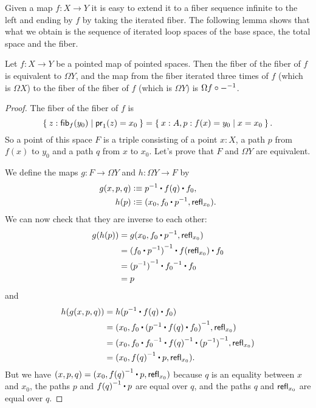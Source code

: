 Given a map $f:X\to Y$ it is easy to extend it to a fiber sequence infinite to
the left and ending by $f$ by taking the iterated fiber. The following lemma
shows that what we obtain is the sequence of iterated loop spaces of the base
space, the total space and the fiber.

\begin{lem}
  Let $f:X\to Y$ be a pointed map of pointed spaces. Then the fiber of the fiber
  of $f$ is equivalent to $\Omega Y$, and the map from the fiber iterated three
  times of $f$ (which is $\Omega X$) to the fiber of the fiber of $f$ (which is
  $\Omega Y$) is $\Omega f\circ\mathord{{-}^{-1}}$.
\end{lem}
\begin{proof}
  The fiber of the fiber of $f$ is
  \begin{equation*}
    \setof{z:\hfib{f}{y_0} | \proj{1}(z) = x_0} =
    \setof{x:A,p:f(x)=y_0 | x = x_0}.
  \end{equation*}
  So a point of this space $F$ is a triple consisting of a point $x:X$, a path
  $p$ from $f(x)$ to $y_0$ and a path $q$ from $x$ to $x_0$. Let’s prove that
  $F$ and $\Omega Y$ are equivalent.

  We define the maps $g : F \to \Omega Y$ and $h : \Omega Y \to F$ by
  \begin{align*}
    g(x,p,q) &\defeq \rev{p}\ct\ap{f}{q}\ct f_0,\\
    h(p) &\defeq (x_0, f_0\ct\rev{p}, \refl{x_0}).
  \end{align*}
  We can now check that they are inverse to each other:
  \begin{align*}
    g(h(p)) &= g(x_0, f_0\ct\rev{p}, \refl{x_0}) \\
    &= \rev{(f_0\ct\rev{p})}\ct\ap{f}{\refl{x_0}}\ct f_0 \\
    &= \rev{(\rev{p})}\ct\rev{f_0}\ct f_0 \\
    &= p
  \end{align*}
  and
  \begin{align*}
    h(g(x,p,q)) &= h(\rev{p}\ct\ap{f}{q}\ct f_0)\\
    &= (x_0, f_0\ct\rev{(\rev{p}\ct\ap{f}{q}\ct f_0)}, \refl{x_0}) \\
    &= (x_0, f_0\ct\rev{f_0}\ct\rev{\ap{f}{q}}\ct\rev{(\rev{p})}, \refl{x_0}) \\
    &= (x_0, \rev{\ap{f}{q}}\ct p, \refl{x_0}). \\
  \end{align*}
  But we have $(x,p,q)=(x_0, \rev{\ap{f}{q}}\ct p, \refl{x_0})$ because $q$ is
  an equality between $x$ and $x_0$, the paths $p$ and $\rev{\ap{f}{q}}\ct p$
  are equal over $q$, and the paths $q$ and $\mathsf{refl}_{x_0}$ are equal over $q$.


\end{proof}
